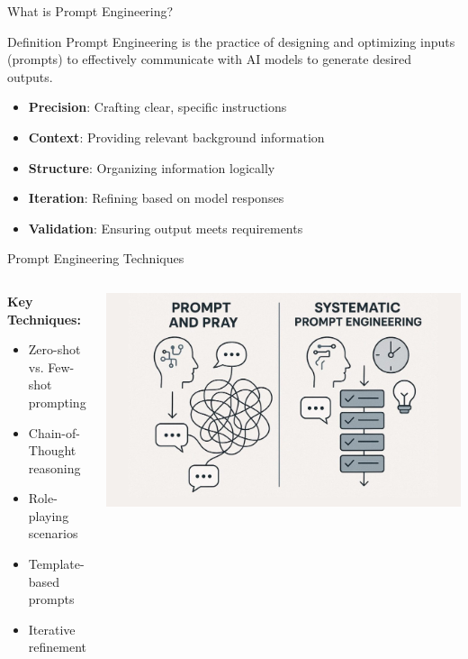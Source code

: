 \documentclass{beamer}
\begin{document}
\begin{frame}{What is Prompt Engineering?}
    \begin{block}{Definition}
        Prompt Engineering is the practice of designing and optimizing inputs (prompts) to effectively communicate with AI models to generate desired outputs.
    \end{block}
    
    \begin{itemize}
        \item \textbf{Precision}: Crafting clear, specific instructions
        \item \textbf{Context}: Providing relevant background information
        \item \textbf{Structure}: Organizing information logically
        \item \textbf{Iteration}: Refining based on model responses
        \item \textbf{Validation}: Ensuring output meets requirements
    \end{itemize}
\end{frame}

\begin{frame}{Prompt Engineering Techniques}
    \begin{columns}
        \begin{column}{0.6\textwidth}
            \textbf{Key Techniques:}
            \begin{itemize}
                \item Zero-shot vs. Few-shot prompting
                \item Chain-of-Thought reasoning
                \item Role-playing scenarios
                \item Template-based prompts
                \item Iterative refinement
            \end{itemize}
        \end{column}
        \begin{column}{0.4\textwidth}
            \centering
            \includegraphics[width=\textwidth]{images/prompt.jpeg} %
        \end{column}
    \end{columns}
\end{frame}
\end{document}
